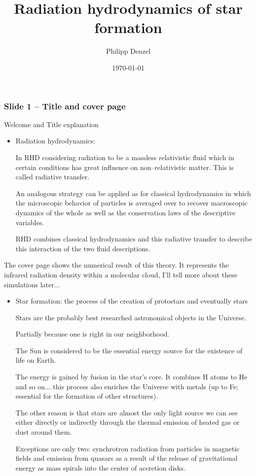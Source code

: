 \documentclass{beamer}
\title{Radiation hydrodynamics of star formation}
\author{Philipp Denzel}
\date{\today}
\institute{Institute for Computational Science}
\begin{document}
\begin{frame}
 \frametitle{Slide 1 -- Title and cover page}
 Welcome and Title explanation

 \begin{itemize}
   \item Radiation hydrodynamics:

   In RHD considering radiation to be a massless relativistic fluid which in certain conditions has great influence on non--relativistic matter.
   This is called radiative transfer.

   An analogous strategy can be applied as for classical hydrodynamics in which the microscopic behavior of particles is averaged over to recover macroscopic dynamics of the whole as well as the conservation laws of the descriptive variables.

   RHD combines classical hydrodynamics and this radiative transfer to describe this interaction of the two fluid descriptions.
 \end{itemize}

 The cover page shows the numerical result of this theory.
 It represents the infrared radiation density within a molecular cloud, I'll tell more about these simulations later...
\end{frame}
\begin{frame}
 \begin{itemize}
   \item Star formation: the process of the creation of protostars and eventually stars

   Stars are the probably best researched astronomical objects in the Universe.

   Partially because one is right in our neighborhood.

   The Sun is considered to be the essential energy source for the existence of life on Earth.

   The energy is gained by fusion in the star's core. It combines H atoms to He and so on... this process also enriches the Universe with metals (up to Fe; essential for the formation of other structures).

   The other reason is that stars are almost the only light source we can see either directly or indirectly through the thermal emission of heated gas or dust around them.

   Exceptions are only two: synchrotron radiation from particles in magnetic fields and emission from quasars as a result of the release of gravitational energy as mass spirals into the center of accretion disks.
 \end{itemize}
\end{frame}
\end{document}
